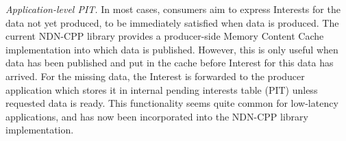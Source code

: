 \documentclass{icn/sig-alternate-2012} %
\begin{document}













\textit{Application-level PIT.} In most cases, consumers aim to express Interests for the data not yet produced, to be immediately satisfied when data is produced. The current NDN-CPP library provides a producer-side Memory Content Cache implementation into which data is published. However, this is only useful when data has been published and put in the cache before Interest for this data has arrived. For the missing data, the Interest is forwarded to the producer application which stores it in internal pending interests table (PIT) unless requested data is ready. This functionality seems quite common for low-latency applications, and has now been incorporated into the NDN-CPP library implementation.
\end{document}

